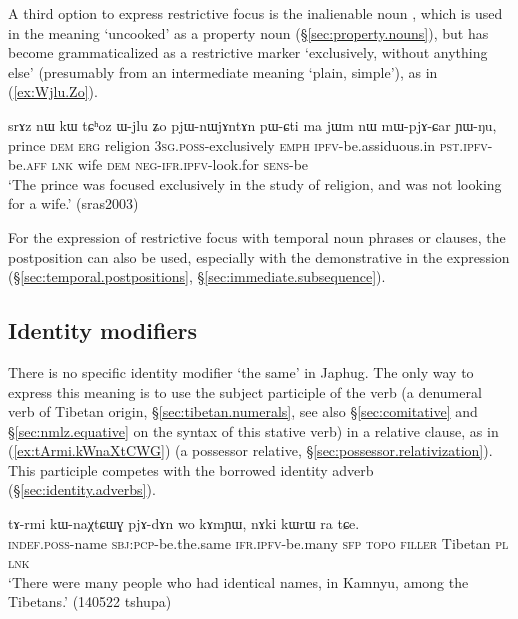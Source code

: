 A third option to express restrictive focus is the inalienable noun , which is used in the meaning `uncooked' as a property noun (§\ref{sec:property.nouns}), but has become grammaticalized as a restrictive marker `exclusively, without anything else' (presumably from an intermediate meaning `plain, simple'), as in (\ref{ex:Wjlu.Zo}).

\begin{exe}
\ex \label{ex:Wjlu.Zo}
 \gll srɤz nɯ kɯ tɕʰoz ɯ-jlu ʑo pjɯ-nɯjɤntɤn pɯ-ɕti ma jɯm nɯ mɯ-pjɤ-ɕar ɲɯ-ŋu, \\
prince \textsc{dem} \textsc{erg}  religion \textsc{3sg}.\textsc{poss}-exclusively \textsc{emph} \textsc{ipfv}-be.assiduous.in  \textsc{pst}.\textsc{ipfv}-be.\textsc{aff} \textsc{lnk} wife \textsc{dem} \textsc{neg}-\textsc{ifr}.\textsc{ipfv}-look.for \textsc{sens}-be \\
 \glt `The prince was focused exclusively in the study of religion, and was not looking for a wife.' (sras2003)
 \end{exe}

For the expression of restrictive focus with temporal noun phrases or clauses, the postposition  can also be used, especially with the demonstrative in the expression  (§\ref{sec:temporal.postpositions}, §\ref{sec:immediate.subsequence}).



\subsection{Identity modifiers} \label{sec:identity.modifier}
There is no specific identity modifier `the same' in Japhug. The only way to express this meaning is to use the subject participle of the verb  (a denumeral verb of Tibetan origin, §\ref{sec:tibetan.numerals}, see also §\ref{sec:comitative} and §\ref{sec:nmlz.equative} on the syntax of this stative verb) in a relative clause, as in (\ref{ex:tArmi.kWnaXtCWG}) (a possessor relative, §\ref{sec:possessor.relativization}). This participle competes with the borrowed identity adverb  (§\ref{sec:identity.adverbs}).

\begin{exe}
\ex \label{ex:tArmi.kWnaXtCWG}
\gll tɤ-rmi kɯ-naχtɕɯɣ pjɤ-dɤn wo kɤmɲɯ, nɤki kɯrɯ ra tɕe. \\
\textsc{indef}.\textsc{poss}-name \textsc{sbj}:\textsc{pcp}-be.the.same \textsc{ifr}.\textsc{ipfv}-be.many \textsc{sfp}  \textsc{topo} \textsc{filler} Tibetan \textsc{pl} \textsc{lnk} \\
\glt `There were many people who had identical names, in Kamnyu, among the Tibetans.' (140522 tshupa) 	
\end{exe}


